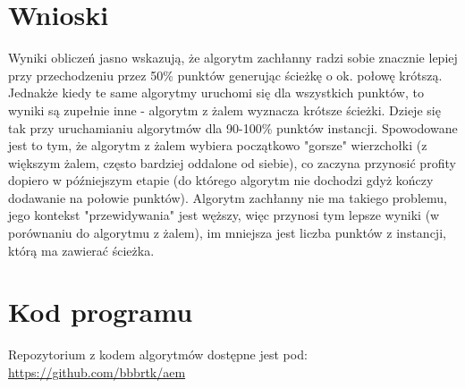 \documentclass{article}
\begin{document}
\section{Wnioski}

    Wyniki obliczeń jasno wskazują, że algorytm zachłanny radzi sobie znacznie lepiej przy przechodzeniu przez 50\% punktów generując ścieżkę o ok. połowę krótszą. Jednakże kiedy te same algorytmy uruchomi się dla wszystkich punktów, to wyniki są zupełnie inne - algorytm z żalem wyznacza krótsze ścieżki. Dzieje się tak przy uruchamianiu algorytmów dla 90-100\% punktów instancji. Spowodowane jest to tym, że algorytm z żalem wybiera początkowo "gorsze" wierzchołki (z większym żalem, często bardziej oddalone od siebie), co zaczyna przynosić profity dopiero w późniejszym etapie (do którego algorytm nie dochodzi gdyż kończy dodawanie na połowie punktów). Algorytm zachłanny nie ma takiego problemu, jego kontekst "przewidywania" jest węższy, więc przynosi tym lepsze wyniki (w porównaniu do algorytmu z żalem), im mniejsza jest liczba punktów z instancji, którą ma zawierać ścieżka.

\section{Kod programu}

    Repozytorium z kodem algorytmów dostępne jest pod: \url{https://github.com/bbbrtk/aem}
\end{document}
